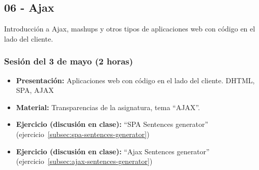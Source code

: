 \documentclass[a4paper,12pt]{article}
\begin{document}

\subsection{06 - Ajax}

Introducción a Ajax, mashups y otros tipos de aplicaciones web con código en el lado del cliente.

\subsubsection{Sesión del 3 de mayo (2 horas)}


\begin{itemize}
\item \textbf{Presentación:} Aplicaciones web con código en el lado del cliente. DHTML, SPA, AJAX
\item \textbf{Material:} Transparencias de la asignatura, tema ``AJAX''.
\item \textbf{Ejercicio (discusión en clase):} ``SPA Sentences generator'' (ejercicio~\ref{subsec:spa-sentences-generator})
\item \textbf{Ejercicio (discusión en clase):} ``Ajax Sentences generator'' (ejercicio~\ref{subsec:ajax-sentences-generator})
\end{itemize}

%
%
%
%
%
%
%
\end{document}
